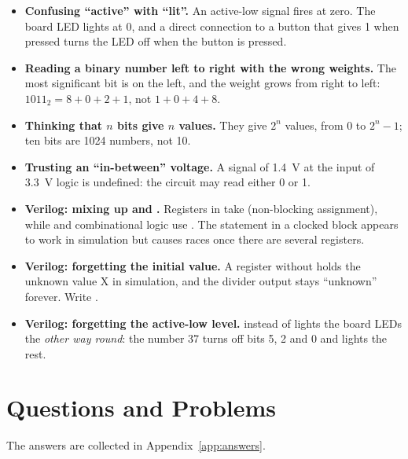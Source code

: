 \begin{warnbox}
\begin{itemize}
  \item \textbf{Confusing ``active'' with ``lit''.} An active-low signal fires
    at zero. The board LED lights at 0, and a direct connection to a button
    that gives 1 when pressed turns the LED off when the button is pressed.
  \item \textbf{Reading a binary number left to right with the wrong weights.}
    The most significant bit is on the left, and the weight grows from right
    to left: $1011_2 = 8+0+2+1$, not $1+0+4+8$.
  \item \textbf{Thinking that $n$ bits give $n$ values.} They give $2^n$
    values, from $0$ to $2^n-1$; ten bits are 1024 numbers, not 10.
  \item \textbf{Trusting an ``in-between'' voltage.} A signal of 1.4~V at the
    input of 3.3~V logic is undefined: the circuit may read either 0 or 1.
  \item \textbf{Verilog: mixing up \code{=} and \code{<=}.} Registers in
     take \code{<=} (non-blocking assignment), while
     and combinational logic use \code{=}. The statement
     in a clocked block appears to work in
    simulation but causes races once there are several registers.
  \item \textbf{Verilog: forgetting the initial value.} A register 
    without  holds the unknown value X in simulation, and the
    divider output stays ``unknown'' forever. Write .
  \item \textbf{Verilog: forgetting the active-low level.}  instead of  lights the board LEDs the
    \emph{other way round}: the number 37 turns off bits 5, 2 and 0 and lights
    the rest.
\end{itemize}
\end{warnbox}

\section{Questions and Problems}
\label{sec:tasks-signals}

The answers are collected in Appendix~\ref{app:answers}.

